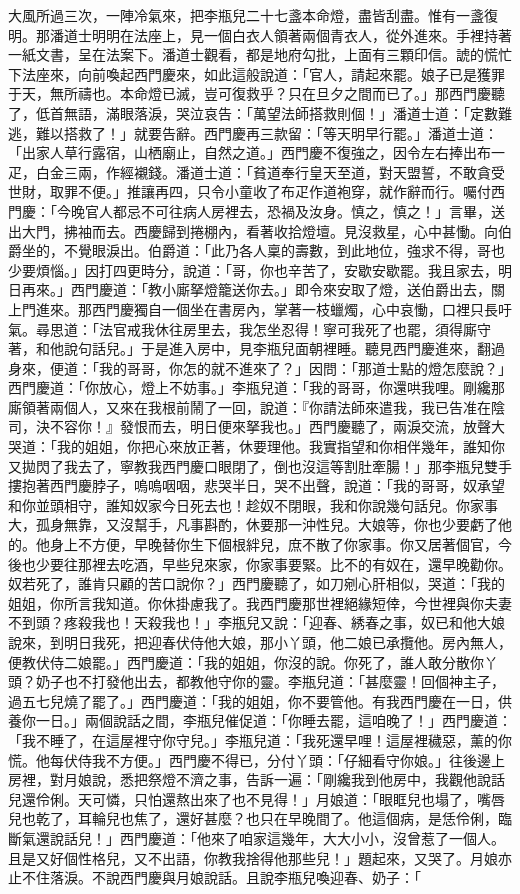\begin{showcontents}{}
大風所過三次，一陣冷氣來，把李瓶兒二十七盞本命燈，盡皆刮盡。惟有一盞復明。那潘道士明明在法座上，見一個白衣人領著兩個青衣人，從外進來。手裡持著一紙文書，呈在法案下。潘道士觀看，都是地府勾批，上面有三顆印信。諕的慌忙下法座來，向前喚起西門慶來，如此這般說道：「官人，請起來罷。娘子已是獲罪于天，無所禱也。本命燈已滅，豈可復救乎？只在旦夕之間而已了。」那西門慶聽了，低首無語，滿眼落淚，哭泣哀告：「萬望法師搭救則個！」潘道士道：「定數難逃，難以搭救了！」就要告辭。西門慶再三款留：「等天明早行罷。」潘道士道：「出家人草行露宿，山栖廟止，自然之道。」西門慶不復強之，因令左右捧出布一疋，白金三兩，作經襯錢。潘道士道：「貧道奉行皇天至道，對天盟誓，不敢貪受世財，取罪不便。」推讓再四，只令小童收了布疋作道袍穿，就作辭而行。囑付西門慶：「今晚官人都忌不可往病人房裡去，恐禍及汝身。慎之，慎之！」言畢，送出大門，拂袖而去。西慶歸到捲棚內，看著收拾燈壇。見沒救星，心中甚慟。向伯爵坐的，不覺眼淚出。伯爵道：「此乃各人稟的壽數，到此地位，強求不得，哥也少要煩惱。」因打四更時分，說道：「哥，你也辛苦了，安歇安歇罷。我且家去，明日再來。」西門慶道：「教小廝拏燈籠送你去。」即令來安取了燈，送伯爵出去，關上門進來。那西門慶獨自一個坐在書房內，掌著一枝蠟燭，心中哀慟，口裡只長吁氣。尋思道：「法官戒我休往房里去，我怎坐忍得！寧可我死了也罷，須得廝守著，和他說句話兒。」于是進入房中，見李瓶兒面朝裡睡。聽見西門慶進來，翻過身來，便道：「我的哥哥，你怎的就不進來了？」因問：「那道士點的燈怎麼說？」西門慶道：「你放心，燈上不妨事。」李瓶兒道：「我的哥哥，你還哄我哩。剛纔那廝領著兩個人，又來在我根前鬧了一回，說道：『你請法師來遣我，我已告准在陰司，決不容你！』發恨而去，明日便來拏我也。」西門慶聽了，兩淚交流，放聲大哭道：「我的姐姐，你把心來放正著，休要理他。我實指望和你相伴幾年，誰知你又拋閃了我去了，寧教我西門慶口眼閉了，倒也沒這等割肚牽腸！」那李瓶兒雙手摟抱著西門慶脖子，嗚嗚咽咽，悲哭半日，哭不出聲，說道：「我的哥哥，奴承望和你並頭相守，誰知奴家今日死去也！趁奴不閉眼，我和你說幾句話兒。你家事大，孤身無靠，又沒幫手，凡事斟酌，休要那一沖性兒。大娘等，你也少要虧了他的。他身上不方便，早晚替你生下個根絆兒，庶不散了你家事。你又居著個官，今後也少要往那裡去吃酒，早些兒來家，你家事要緊。比不的有奴在，還早晚勸你。奴若死了，誰肯只顧的苦口說你？」西門慶聽了，如刀剜心肝相似，哭道：「我的姐姐，你所言我知道。你休掛慮我了。我西門慶那世裡絕緣短倖，今世裡與你夫妻不到頭？疼殺我也！天殺我也！」李瓶兒又說：「迎春、綉春之事，奴已和他大娘說來，到明日我死，把迎春伏侍他大娘，那小丫頭，他二娘已承攬他。房內無人，便教伏侍二娘罷。」西門慶道：「我的姐姐，你沒的說。你死了，誰人敢分散你丫頭？奶子也不打發他出去，都教他守你的靈。李瓶兒道：「甚麼靈！回個神主子，過五七兒燒了罷了。」西門慶道：「我的姐姐，你不要管他。有我西門慶在一日，供養你一日。」兩個說話之間，李瓶兒催促道：「你睡去罷，這咱晚了！」西門慶道：「我不睡了，在這屋裡守你守兒。」李瓶兒道：「我死還早哩！這屋裡穢惡，薰的你慌。他每伏侍我不方便。」西門慶不得已，分付丫頭：「仔細看守你娘。」往後邊上房裡，對月娘說，悉把祭燈不濟之事，告訴一遍：「剛纔我到他房中，我觀他說話兒還伶俐。天可憐，只怕還熬出來了也不見得！」月娘道：「眼眶兒也塌了，嘴唇兒也乾了，耳輪兒也焦了，還好甚麼？也只在早晚間了。他這個病，是恁伶俐，臨斷氣還說話兒！」西門慶道：「他來了咱家這幾年，大大小小，沒曾惹了一個人。且是又好個性格兒，又不出語，你教我捨得他那些兒！」題起來，又哭了。月娘亦止不住落淚。不說西門慶與月娘說話。且說李瓶兒喚迎春、奶子：「
\end{showcontents}
